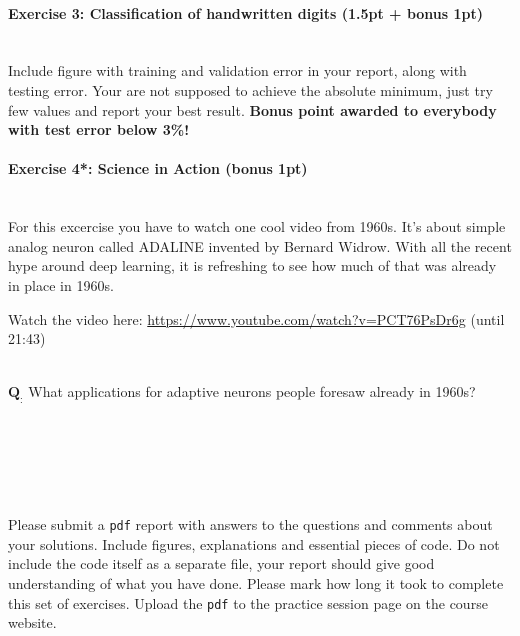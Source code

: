 \documentclass[a4paper,11pt]{article}
\newenvironment{exercise}[3]{\paragraph{Exercise #1: #2 (#3pt)}\ \\}{
\medskip}
\newcommand{\question}[2]{\setlength\parindent{0mm}\ \\$\mathbf{Q_#1:}$ #2\ \\}
\begin{document}
\begin{exercise}{3}{Classification of handwritten digits}{1.5pt + bonus 1}
Include figure with training and validation error in your report, along with testing error. Your are not supposed to achieve the absolute minimum, just try few values and report your best result. \textbf{Bonus point awarded to everybody with test error below 3\%!}

\end{exercise}



%
%
\begin{exercise}{4*}{Science in Action}{bonus 1}

For this excercise you have to watch one cool video from 1960s. It's about simple analog neuron called ADALINE invented by Bernard Widrow. With all the recent hype around deep learning, it is refreshing to see how much of that was already in place in 1960s.

Watch the video here: \url{https://www.youtube.com/watch?v=PCT76PsDr6g} (until 21:43)

\question{}{What applications for adaptive neurons people foresaw already in 1960s?}

\end{exercise}


\ \\
\ \\
\ \\
\ \\
\ \\
Please submit a \texttt{pdf} report with answers to the questions and comments about your solutions. Include figures, explanations and essential pieces of code. Do not include the code itself as a separate file, your report should give good understanding of what you have done. Please mark how long it took to complete this set of exercises. Upload the \texttt{pdf} to the practice session page on the course website.
\end{document}
